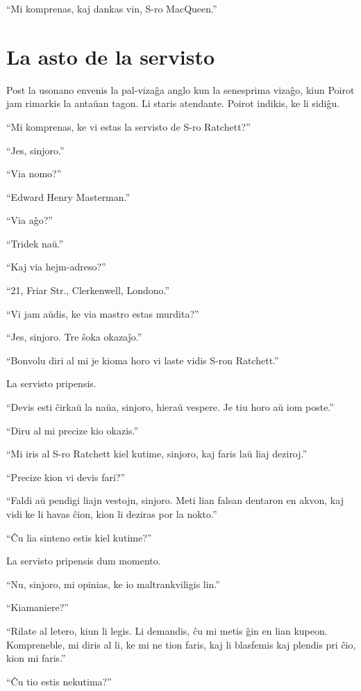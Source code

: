 ``Mi komprenas, kaj dankas vin, S-ro MacQueen.''

\chapter[La asto de la servisto]{La asto de la servisto}


Post la usonano envenis la pal-vizaĝa anglo kun la senesprima vizaĝo, kiun Poirot jam rimarkis la antaŭan tagon. Li staris atendante. Poirot indikis, ke li sidiĝu.

``Mi komprenas, ke vi estas la servisto de S-ro Ratchett?''

``Jes, sinjoro.''

``Via nomo?''

``Edward Henry Masterman.''

``Via aĝo?''

``Tridek naŭ.''

``Kaj via hejm-adreso?''

``21, Friar Str., Clerkenwell, Londono.''

``Vi jam aŭdis, ke via mastro estas murdita?''

``Jes, sinjoro. Tre ŝoka okazaĵo.''

``Bonvolu diri al mi je kioma horo vi laste vidis S-ron Ratchett.''

La servisto pripensis.

``Devis esti ĉirkaŭ la naŭa, sinjoro, hieraŭ vespere. Je tiu horo aŭ iom poste.''

``Diru al mi precize kio okazis.''

``Mi iris al S-ro Ratchett kiel kutime, sinjoro, kaj faris laŭ liaj deziroj.''

``Precize kion vi devis fari?''

``Faldi aŭ pendigi liajn vestojn, sinjoro. Meti lian falsan dentaron en akvon, kaj vidi ke li havas ĉion, kion li deziras por la nokto.''

``Ĉu lia sinteno estis kiel kutime?''

La servisto pripensis dum momento.

``Nu, sinjoro, mi opinias, ke io maltrankviligis lin.''

``Kiamaniere?''

``Rilate al letero, kiun li legis. Li demandis, ĉu mi metis ĝin en lian kupeon. Kompreneble, mi diris al li, ke mi ne tion faris, kaj li blasfemis kaj plendis pri ĉio, kion mi faris.''

``Ĉu tio estis nekutima?''

